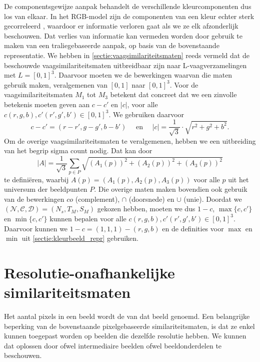 De componentsgewijze aanpak behandelt de verschillende kleurcomponenten dus los van
elkaar. In het RGB-model zijn de componenten van een kleur echter sterk gecorreleerd 
\cite{sharma:digital_color_imaging}, waardoor er
informatie verloren gaat als we ze elk afzonderlijk beschouwen. Dat verlies van informatie kan vermeden
worden door gebruik te maken van een traliegebaseerde aanpak,
op basis van de bovenstaande representatie.
We hebben in \ref{sectie:vaagsimilariteitsmaten} reeds vermeld dat de beschouwde 
vaagsimilariteitsmaten uitbreidbaar zijn naar L-vaag\-ver\-za\-me\-ling\-en met
$L=[0,1]^3$. Daarvoor moeten we de bewerkingen waarvan die maten gebruik maken, veralgemenen van 
$[0,1]$ naar $[0,1]^3$. 
Voor de vaagsimilariteitsmaten $M_1$ tot $M_3$ betekent dat concreet dat we een zinvolle betekenis 
moeten geven aan $c - c'$ en $|c|$, voor alle $c(r,g,b),c'(r',g',b') \in [0,1]^3$. We gebruiken
daarvoor 
\begin{displaymath}
c - c' = (r-r',g-g',b-b') \quad \textrm{ en } \quad |c| = \frac{1}{\sqrt{3}} \cdot \sqrt{r^2 + g^2 + b^2}.
\end{displaymath}
Om de overige vaagsimilariteitsmaten te veralgemenen, hebben we een uitbreiding van het
begrip sigma count nodig. Dat kan door
\begin{displaymath}
|A|=\frac{1}{\sqrt{3}}\sum_{p \in P}\sqrt{(A_1(p))^2+(A_2(p))^2+(A_3(p))^2}
\end{displaymath}
te defini\"eren, waarbij $A(p)=(A_1(p),A_2(p),A_3(p))$ voor alle $p$ uit het
universum der beeldpunten $P$. Die overige maten maken 
bovendien ook gebruik van de bewerkingen $co$ (complement), 
$\cap$ (doorsnede) en $\cup$ (unie). Doordat we 
$(\mathcal{N},\mathcal{C},\mathcal{D})=(N_s,T_M,S_M)$ gekozen hebben, moeten we
dus $1 - c$, $\max \{c,c'\}$ en $\min \{c,c'\}$ kunnen bepalen voor alle 
$c(r,g,b),c'(r',g',b') \in [0,1]^3$. Daarvoor kunnen we $1 - c = (1,1,1) - (r,g,b)$ en de
definities voor $\max$ en $\min$ uit \ref{sectie:kleurbeeld_repr} gebruiken.


\section{Resolutie-onafhankelijke similariteitsmaten}
\label{sectie:res-onafh}

Het aantal pixels in een beeld wordt de  van dat beeld genoemd.
Een belangrijke beperking van de bovenstaande pixelgebaseerde similariteitsmaten, is dat
ze enkel kunnen toegepast worden op beelden die dezelfde resolutie hebben.
We kunnen dat oplossen door ofwel intermediaire beelden ofwel beeldonderdelen te beschouwen.

